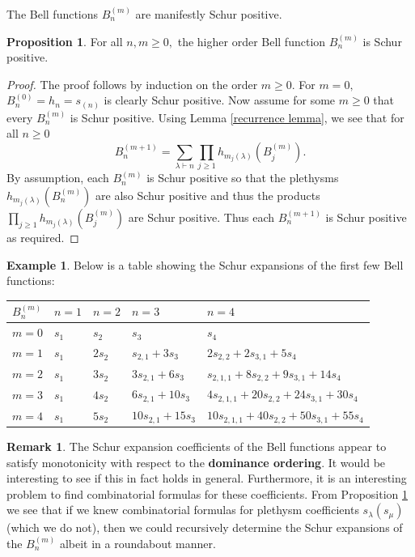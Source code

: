 \documentclass[12pt,reqno]{amsart}
\theoremstyle{definition}
\newtheorem{prop}[thm]{Proposition}
\newtheorem{remark}{Remark}
\newtheorem{example}{Example}
\begin{document}
The Bell functions $B_n^{(m)}$ are manifestly Schur positive.

\begin{prop}\label{plethystic recursion}
    For all $n,m \geq 0,$ the higher order Bell function $B_n^{(m)}$ is Schur positive. 
\end{prop}
\begin{proof}
    The proof follows by induction on the order $m \geq 0.$ For $m =0,$ $B_n^{(0)} = h_n=s_{(n)}$ is clearly Schur positive. Now assume for some $m \geq 0$ that every $B_n^{(m)}$ is Schur positive. Using Lemma \ref{recurrence lemma}, we see that for all $n \geq 0$
    $$B_n^{(m+1)} = \sum_{\lambda \vdash n} \prod_{j \geq 1} h_{m_j(\lambda)}(B_{j}^{(m)}).$$ By assumption, each $B_{n}^{(m)}$ is Schur positive so that the plethysms $h_{m_j(\lambda)}(B_{n}^{(m)})$ are also Schur positive and thus the products $\prod_{j \geq 1} h_{m_j(\lambda)}(B_{j}^{(m)})$ are Schur positive. Thus each $B_n^{(m+1)}$ is Schur positive as required.
\end{proof}



\begin{example}

Below is a table showing the Schur expansions of the first few Bell functions:

\begin{center}
\begin{tabular}{ | m{1.5cm} | m{1.5cm}| m{1.5cm} | m{3cm} | m{5cm} | } 
  \hline 
  $B_n^{(m)}$ & $n=1$  & $n=2$  & $n =3$  & $n =4$ \\ 
  \hline
  $m = 0$ & $s_1$ & $s_2$ & $s_3$ & $s_4$  \\
  \hline
  $m=1$ & $s_1$ & $2s_2$ & $ s_{2,1} + 3s_3$ & $2s_{2,2} + 2s_{3,1} + 5s_4$  \\ 
  \hline
  $m=2$ & $s_1$ & $ 3s_2 $ & $3s_{2,1} + 6s_3$ & $s_{2,1,1} + 8s_{2,2} + 9s_{3,1} + 14s_{4}$ \\ 
  \hline
  $m=3$ & $s_1$ & $4s_2$ & $6s_{2,1} + 10s_3$ & $4s_{2,1,1} + 20s_{2,2} + 24s_{3,1} + 30s_{4}$ \\
  \hline
  $m=4$ & $s_1$ & $5s_2$ & $10s_{2,1} + 15 s_3$ & $10s_{2,1,1}+40s_{2,2}+50s_{3,1} + 55s_4$ \\
  \hline
\end{tabular}
\end{center}

\end{example}

\begin{remark}
    The Schur expansion coefficients of the Bell functions appear to satisfy monotonicity with respect to the \textbf{dominance ordering}. It would be interesting to see if this in fact holds in general. Furthermore, it is an interesting problem to find combinatorial formulas for these coefficients. From Proposition \ref{plethystic recursion} we see that if we knew combinatorial formulas for plethysm coefficients $s_{\lambda}(s_{\mu})$ (which we do not), then we could recursively determine the Schur expansions of the $B_n^{(m)}$ albeit in a roundabout manner. 
\end{remark}
\end{document}
